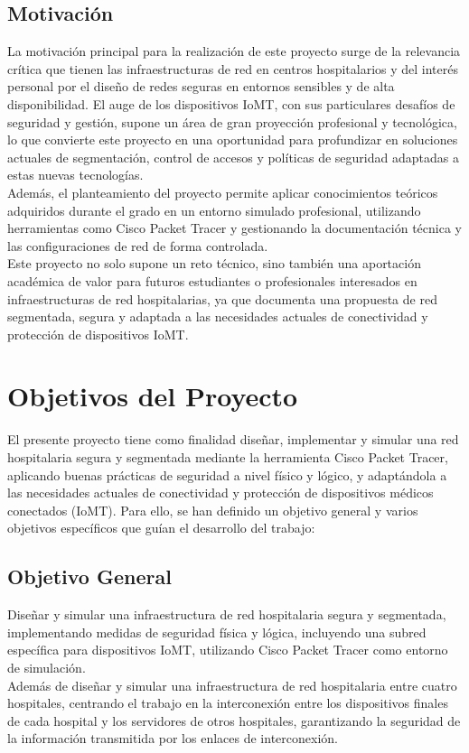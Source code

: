 \subsection{Motivación}
La motivación principal para la realización de este proyecto surge de la relevancia crítica que tienen las infraestructuras de red en centros 
hospitalarios y del interés personal por el diseño de redes seguras en entornos sensibles y de alta disponibilidad. El auge de los dispositivos \acs{IoMT}, con sus particulares 
desafíos de seguridad y gestión, supone un área de gran proyección profesional y tecnológica, lo que convierte este proyecto en una oportunidad para profundizar en soluciones 
actuales de segmentación, control de accesos y políticas de seguridad adaptadas a estas nuevas tecnologías. \\

Además, el planteamiento del proyecto permite aplicar conocimientos teóricos adquiridos durante el grado en un entorno simulado profesional, utilizando herramientas como 
Cisco Packet Tracer y gestionando la documentación técnica y las configuraciones de red de forma controlada. \\

Este proyecto no solo supone un reto técnico, sino también una aportación académica de valor para futuros estudiantes o profesionales interesados en infraestructuras de 
red hospitalarias, ya que documenta una propuesta de red segmentada, segura y adaptada a las necesidades actuales de conectividad y protección de dispositivos \acs{IoMT}.

\section{Objetivos del Proyecto}
El presente proyecto tiene como finalidad diseñar, implementar y simular una red hospitalaria segura y segmentada mediante la herramienta Cisco Packet Tracer, aplicando buenas 
prácticas de seguridad a nivel físico y lógico, y adaptándola a las necesidades actuales de conectividad y protección de dispositivos médicos conectados (\acs{IoMT}). Para ello, 
se han definido un objetivo general y varios objetivos específicos que guían el desarrollo del trabajo:

\subsection{Objetivo General}
Diseñar y simular una infraestructura de red hospitalaria segura y segmentada, implementando medidas de seguridad física y lógica, incluyendo una subred específica para 
dispositivos \ac{IoMT}, utilizando Cisco Packet Tracer como entorno de simulación.
\\
Además de diseñar y simular una infraestructura de red hospitalaria entre cuatro hospitales, centrando el trabajo en la interconexión entre los dispositivos finales de cada hospital 
y los servidores de otros hospitales, garantizando la seguridad de la información transmitida por los enlaces de interconexión.

